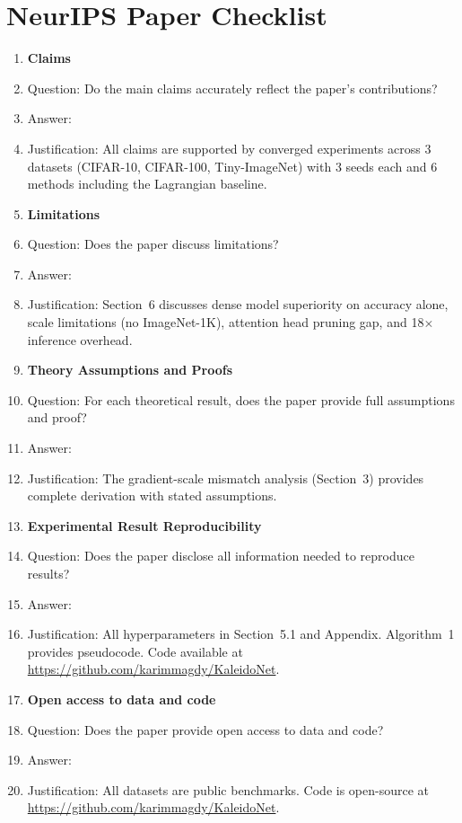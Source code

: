 \documentclass[10pt]{article}
\begin{document}
\section*{NeurIPS Paper Checklist}
\begin{enumerate}
\item {\bf Claims}
\item[] Question: Do the main claims accurately reflect the paper's contributions?
\item[] Answer: \answerYes{}
\item[] Justification: All claims are supported by converged experiments across 3 datasets (CIFAR-10, CIFAR-100, Tiny-ImageNet) with 3 seeds each and 6 methods including the Lagrangian baseline.

\item {\bf Limitations}
\item[] Question: Does the paper discuss limitations?
\item[] Answer: \answerYes{}
\item[] Justification: Section~6 discusses dense model superiority on accuracy alone, scale limitations (no ImageNet-1K), attention head pruning gap, and 18$\times$ inference overhead.

\item {\bf Theory Assumptions and Proofs}
\item[] Question: For each theoretical result, does the paper provide full assumptions and proof?
\item[] Answer: \answerYes{}
\item[] Justification: The gradient-scale mismatch analysis (Section~3) provides complete derivation with stated assumptions.

\item {\bf Experimental Result Reproducibility}
\item[] Question: Does the paper disclose all information needed to reproduce results?
\item[] Answer: \answerYes{}
\item[] Justification: All hyperparameters in Section~5.1 and Appendix. Algorithm~1 provides pseudocode. Code available at \url{https://github.com/karimmagdy/KaleidoNet}.

\item {\bf Open access to data and code}
\item[] Question: Does the paper provide open access to data and code?
\item[] Answer: \answerYes{}
\item[] Justification: All datasets are public benchmarks. Code is open-source at \url{https://github.com/karimmagdy/KaleidoNet}.


\end{enumerate}
\end{document}
